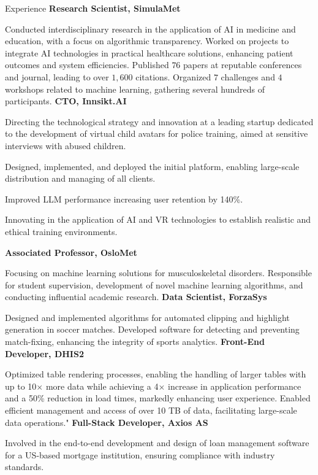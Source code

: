 \begin{rubric}{Experience}
%
\entry*[2021 -- present]%
\textbf{Research Scientist, SimulaMet} \par
Conducted interdisciplinary research in the application of AI in medicine and education, with a focus on algorithmic transparency.
Worked on projects to integrate AI technologies in practical healthcare solutions, enhancing patient outcomes and system efficiencies.
Published $76$ papers at reputable conferences and journal, leading to over $1,600$ citations. Organized $7$ challenges and $4$ workshops related to machine learning, gathering several hundreds of participants.
%
\entry*[2023 -- present]%
\textbf{CTO, Innsikt.AI} \par
\begin{compactitem}
    \item Directing the technological strategy and innovation at a leading startup dedicated to the development of virtual child avatars for police training, aimed at sensitive interviews with abused children.
    \item Designed, implemented, and deployed the initial platform, enabling large-scale distribution and managing of all clients.
    \item Improved LLM performance increasing user retention by 140\%.
    \item Innovating in the application of AI and VR technologies to establish realistic and ethical training environments.
    \vspace{-12pt}
\end{compactitem}
%
\entry*[2023 -- present]%
\textbf{Associated Professor, OsloMet} \par
Focusing on machine learning solutions for musculoskeletal disorders.
Responsible for student supervision, development of novel machine learning algorithms, and conducting influential academic research.
%
\entry*[2022 -- 2023]%
\textbf{Data Scientist, ForzaSys} \par
Designed and implemented algorithms for automated clipping and highlight generation in soccer matches.
Developed software for detecting and preventing match-fixing, enhancing the integrity of sports analytics.
%
\entry*[2017 -- 2018]%
\textbf{Front-End Developer, DHIS2} \par
Optimized table rendering processes, enabling the handling of larger tables with up to 10$\times$ more data while achieving a 4$\times$ increase in application performance and a 50\% reduction in load times, markedly enhancing user experience. Enabled efficient management and access of over 10 TB of data, facilitating large-scale data operations."
%
\entry*[2014 -- 2016]%
\textbf{Full-Stack Developer, Axios AS} \par
Involved in the end-to-end development and design of loan management software for a US-based mortgage institution, ensuring compliance with industry standards.
%
\end{rubric}